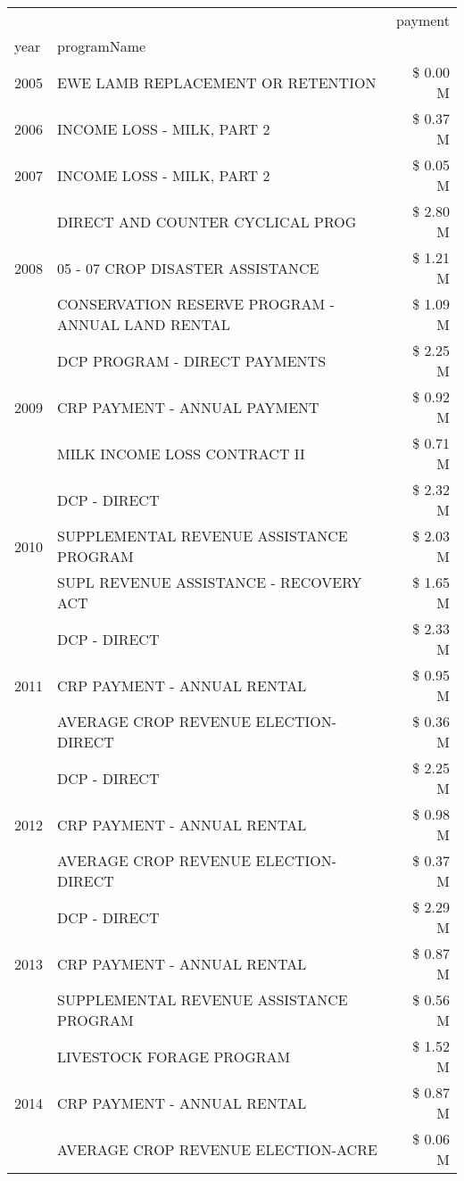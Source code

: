 \begin{tabular}{llr}
\toprule
 &  & payment \\
year & programName &  \\
\midrule
2005 & EWE LAMB REPLACEMENT OR RETENTION & \$ 0.00 M \\
\cline{1-3}
2006 & INCOME LOSS - MILK, PART 2 & \$ 0.37 M \\
\cline{1-3}
2007 & INCOME LOSS - MILK, PART 2 & \$ 0.05 M \\
\cline{1-3}
\multirow[t]{3}{*}{2008} & DIRECT AND COUNTER CYCLICAL PROG & \$ 2.80 M \\
 & 05 - 07 CROP DISASTER ASSISTANCE & \$ 1.21 M \\
 & CONSERVATION RESERVE PROGRAM - ANNUAL LAND RENTAL & \$ 1.09 M \\
\cline{1-3}
\multirow[t]{3}{*}{2009} & DCP PROGRAM - DIRECT PAYMENTS & \$ 2.25 M \\
 & CRP PAYMENT - ANNUAL PAYMENT & \$ 0.92 M \\
 & MILK INCOME LOSS CONTRACT II & \$ 0.71 M \\
\cline{1-3}
\multirow[t]{3}{*}{2010} & DCP - DIRECT & \$ 2.32 M \\
 & SUPPLEMENTAL REVENUE ASSISTANCE PROGRAM & \$ 2.03 M \\
 & SUPL REVENUE ASSISTANCE - RECOVERY ACT & \$ 1.65 M \\
\cline{1-3}
\multirow[t]{3}{*}{2011} & DCP - DIRECT & \$ 2.33 M \\
 & CRP PAYMENT - ANNUAL RENTAL & \$ 0.95 M \\
 & AVERAGE CROP REVENUE ELECTION-DIRECT & \$ 0.36 M \\
\cline{1-3}
\multirow[t]{3}{*}{2012} & DCP - DIRECT & \$ 2.25 M \\
 & CRP PAYMENT - ANNUAL RENTAL & \$ 0.98 M \\
 & AVERAGE CROP REVENUE ELECTION-DIRECT & \$ 0.37 M \\
\cline{1-3}
\multirow[t]{3}{*}{2013} & DCP - DIRECT & \$ 2.29 M \\
 & CRP PAYMENT - ANNUAL RENTAL & \$ 0.87 M \\
 & SUPPLEMENTAL REVENUE ASSISTANCE PROGRAM & \$ 0.56 M \\
\cline{1-3}
\multirow[t]{3}{*}{2014} & LIVESTOCK FORAGE PROGRAM & \$ 1.52 M \\
 & CRP PAYMENT - ANNUAL RENTAL & \$ 0.87 M \\
 & AVERAGE CROP REVENUE ELECTION-ACRE & \$ 0.06 M \\
\cline{1-3}

\end{tabular}
